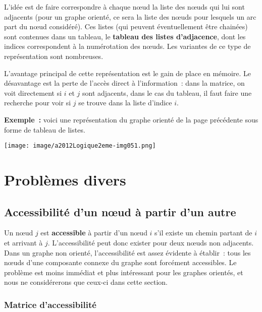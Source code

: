 			L'idée est de faire correspondre à chaque n{\oe}ud la liste 
			des n{\oe}uds qui lui sont adjacents (pour un graphe
			orienté, ce sera la liste des n{\oe}uds pour lesquels un 
			arc part du n{\oe}ud considéré). Ces listes (qui peuvent
			éventuellement être chainées) sont contenues dans un tableau, 
			le \textbf{tableau des listes d'adjacence}, dont les
			indices correspondent à la numérotation des n{\oe}uds. 
			Les variantes de ce type de représentation sont nombreuses.

			L'avantage principal de cette représentation est le gain de 
			place en mémoire. Le désavantage est la perte de l'accès
			direct à l'information~: dans la matrice, on voit directement 
			si $i$ et $j$ sont adjacents, dans le cas du tableau, il faut 
			faire une recherche pour voir si $j$ se trouve dans la liste 
			d'indice $i$.

			\textbf{Exemple~:} voici une représentation du graphe orienté 
			de la page précédente sous forme de tableau de listes.
			\begin{center}
			\texttt{[image: image/a2012Logique2eme-img051.png]}
			\end{center}
			

\section{Problèmes divers}

	\subsection{Accessibilité d'un n{\oe}ud à partir d'un autre}

		Un n{\oe}ud $j$ est \textbf{accessible} à partir d'un n{\oe}ud $i$ 
		s'il existe un chemin partant de $i$ et arrivant à $j$. L'accessibilité 
		peut donc exister pour deux n{\oe}uds non adjacents. 
		Dans un graphe non orienté, l'accessibilité est assez évidente à établir~: 
		tous les n{\oe}uds d'une composante connexe du graphe sont forcément 
		accessibles. Le problème est moins immédiat et plus intéressant pour 
		les graphes orientés, et nous ne considérerons que ceux-ci 
		dans cette section.

		\subsubsection{Matrice d'accessibilité}

